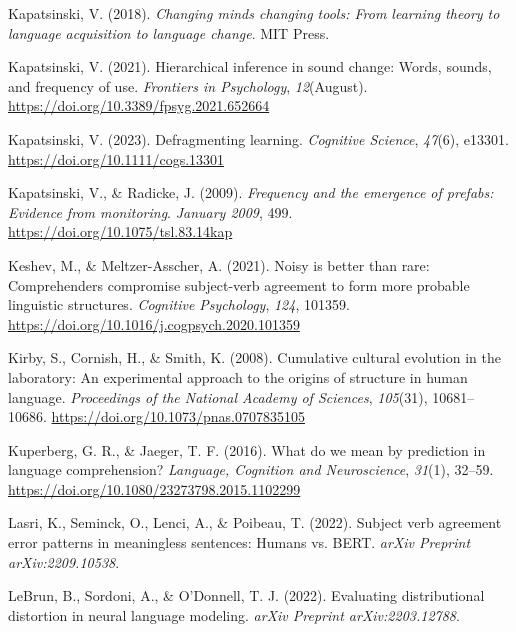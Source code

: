 \documentclass[
  12pt,
  letterpaper,
]{scrreport}
\newlength{\cslhangindent}
\newenvironment{CSLReferences}[2] %
 {\begin{list}{}{%
  \setlength{\itemindent}{0pt}
  \setlength{\leftmargin}{0pt}
  \setlength{\parsep}{0pt}
  \ifodd #1
   \setlength{\leftmargin}{\cslhangindent}
   \setlength{\itemindent}{-1\cslhangindent}
  \fi
  \setlength{\itemsep}{#2\baselineskip}}}
 {\end{list}}
\begin{document}
\begin{CSLReferences}{1}{0}
Kapatsinski, V. (2018). \emph{Changing minds changing tools: From
learning theory to language acquisition to language change}. MIT Press.

Kapatsinski, V. (2021). Hierarchical inference in sound change: Words,
sounds, and frequency of use. \emph{Frontiers in Psychology},
\emph{12}(August). \url{https://doi.org/10.3389/fpsyg.2021.652664}

Kapatsinski, V. (2023). Defragmenting learning. \emph{Cognitive
Science}, \emph{47}(6), e13301. \url{https://doi.org/10.1111/cogs.13301}

Kapatsinski, V., \& Radicke, J. (2009). \emph{Frequency and the
emergence of prefabs: Evidence from monitoring}. \emph{January 2009},
499. \url{https://doi.org/10.1075/tsl.83.14kap}

Keshev, M., \& Meltzer-Asscher, A. (2021). Noisy is better than rare:
Comprehenders compromise subject-verb agreement to form more probable
linguistic structures. \emph{Cognitive Psychology}, \emph{124}, 101359.
\url{https://doi.org/10.1016/j.cogpsych.2020.101359}

Kirby, S., Cornish, H., \& Smith, K. (2008). Cumulative cultural
evolution in the laboratory: An experimental approach to the origins of
structure in human language. \emph{Proceedings of the National Academy
of Sciences}, \emph{105}(31), 10681--10686.
\url{https://doi.org/10.1073/pnas.0707835105}

Kuperberg, G. R., \& Jaeger, T. F. (2016). What do we mean by prediction
in language comprehension? \emph{Language, Cognition and Neuroscience},
\emph{31}(1), 32--59.
\url{https://doi.org/10.1080/23273798.2015.1102299}

Lasri, K., Seminck, O., Lenci, A., \& Poibeau, T. (2022). Subject verb
agreement error patterns in meaningless sentences: Humans vs. BERT.
\emph{arXiv Preprint arXiv:2209.10538}.

LeBrun, B., Sordoni, A., \& O'Donnell, T. J. (2022). Evaluating
distributional distortion in neural language modeling. \emph{arXiv
Preprint arXiv:2203.12788}.


\end{CSLReferences}
\end{document}
